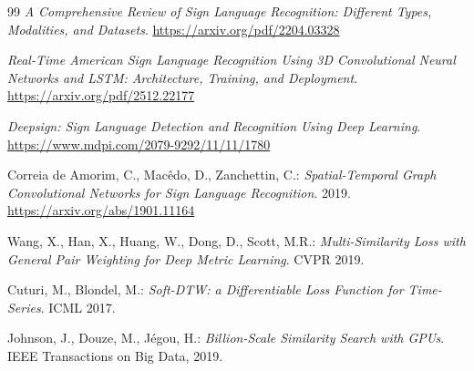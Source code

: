 \begin{thebibliography}{99}
\emph{A Comprehensive Review of Sign Language Recognition: Different Types,
Modalities, and Datasets}.
\url{https://arxiv.org/pdf/2204.03328}

\emph{Real-Time American Sign Language Recognition Using 3D Convolutional
Neural Networks and LSTM: Architecture, Training, and Deployment}.
\url{https://arxiv.org/pdf/2512.22177}

\emph{Deepsign: Sign Language Detection and Recognition Using Deep Learning}.
\url{https://www.mdpi.com/2079-9292/11/11/1780}

Correia de Amorim, C., Mac\^edo, D., Zanchettin, C.:
\emph{Spatial-Temporal Graph Convolutional Networks for Sign Language
Recognition}. 2019.
\url{https://arxiv.org/abs/1901.11164}

Wang, X., Han, X., Huang, W., Dong, D., Scott, M.R.:
\emph{Multi-Similarity Loss with General Pair Weighting for Deep Metric
Learning}. CVPR 2019.

Cuturi, M., Blondel, M.:
\emph{Soft-DTW: a Differentiable Loss Function for Time-Series}. ICML 2017.

Johnson, J., Douze, M., J\'egou, H.:
\emph{Billion-Scale Similarity Search with GPUs}. IEEE Transactions on Big
Data, 2019.

\end{thebibliography}

